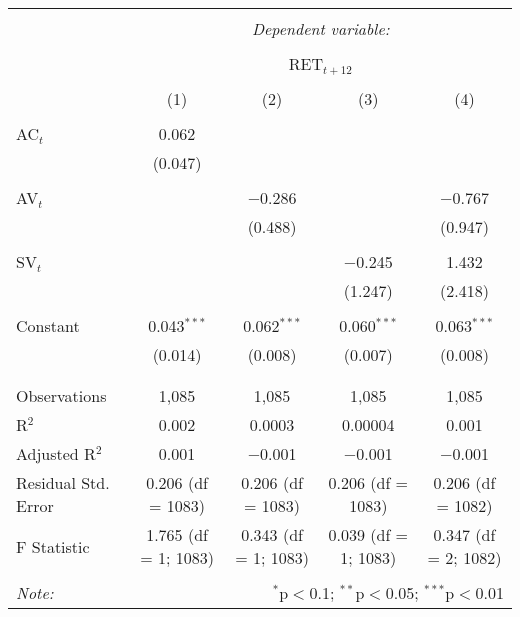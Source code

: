 
\begin{table}[!htbp] \centering 
  \caption{} 
  \label{} 
\begin{tabular}{@{\extracolsep{5pt}}lcccc} 
\\[-1.8ex]\hline 
\hline \\[-1.8ex] 
 & \multicolumn{4}{c}{\textit{Dependent variable:}} \\ 
\cline{2-5} 
\\[-1.8ex] & \multicolumn{4}{c}{RET$_{t+12}$} \\ 
\\[-1.8ex] & (1) & (2) & (3) & (4)\\ 
\hline \\[-1.8ex] 
 AC$_{t}$ & 0.062 &  &  &  \\ 
  & (0.047) &  &  &  \\ 
  & & & & \\ 
 AV$_{t}$ &  & $-$0.286 &  & $-$0.767 \\ 
  &  & (0.488) &  & (0.947) \\ 
  & & & & \\ 
 SV$_{t}$ &  &  & $-$0.245 & 1.432 \\ 
  &  &  & (1.247) & (2.418) \\ 
  & & & & \\ 
 Constant & 0.043$^{***}$ & 0.062$^{***}$ & 0.060$^{***}$ & 0.063$^{***}$ \\ 
  & (0.014) & (0.008) & (0.007) & (0.008) \\ 
  & & & & \\ 
\hline \\[-1.8ex] 
Observations & 1,085 & 1,085 & 1,085 & 1,085 \\ 
R$^{2}$ & 0.002 & 0.0003 & 0.00004 & 0.001 \\ 
Adjusted R$^{2}$ & 0.001 & $-$0.001 & $-$0.001 & $-$0.001 \\ 
Residual Std. Error & 0.206 (df = 1083) & 0.206 (df = 1083) & 0.206 (df = 1083) & 0.206 (df = 1082) \\ 
F Statistic & 1.765 (df = 1; 1083) & 0.343 (df = 1; 1083) & 0.039 (df = 1; 1083) & 0.347 (df = 2; 1082) \\ 
\hline 
\hline \\[-1.8ex] 
\textit{Note:}  & \multicolumn{4}{r}{$^{*}$p$<$0.1; $^{**}$p$<$0.05; $^{***}$p$<$0.01} \\ 
\end{tabular} 
\end{table} 
